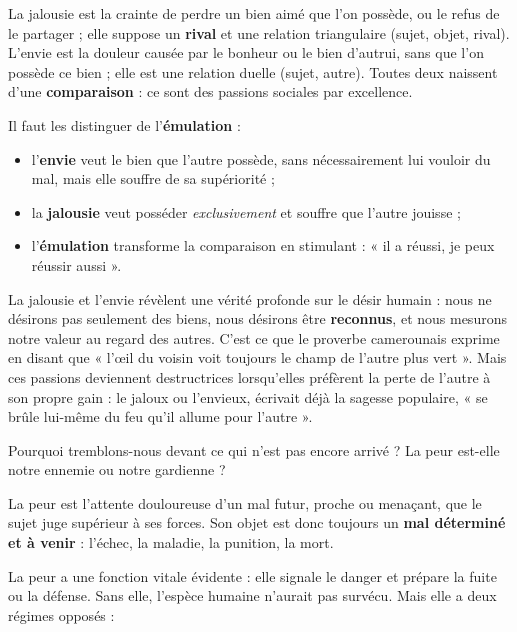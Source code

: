 \documentclass[11pt]{article}
\newcommand{\cle}[1]{{\popxbold\color{popdark}#1}}
\newcounter{popsec}
\newcounter{popsub}
\newcommand{\courssub}[1]{%
  \stepcounter{popsub}%
  \par\vspace{9pt}\noindent{\popxbold\fontsize{11.5}{13}\selectfont\color{popink}{\color{poporange}\thepopsec.\thepopsub}\hspace{6pt}#1}\par\nopagebreak\vspace{4pt}
}
\begin{document}
\begin{definition}
La \cle{jalousie} est la crainte de perdre un bien aimé que l'on possède, ou le refus de le partager ; elle suppose un \textbf{rival} et une relation triangulaire (sujet, objet, rival). L'\cle{envie} est la douleur causée par le bonheur ou le bien d'autrui, sans que l'on possède ce bien ; elle est une relation duelle (sujet, autre). Toutes deux naissent d'une \textbf{comparaison} : ce sont des passions sociales par excellence.
\end{definition}

Il faut les distinguer de l'\textbf{émulation} :

\begin{itemize}
\item l'\textbf{envie} veut le bien que l'autre possède, sans nécessairement lui vouloir du mal, mais elle souffre de sa supériorité ;
\item la \textbf{jalousie} veut posséder \emph{exclusivement} et souffre que l'autre jouisse ;
\item l'\textbf{émulation} transforme la comparaison en stimulant : « il a réussi, je peux réussir aussi ».
\end{itemize}

La jalousie et l'envie révèlent une vérité profonde sur le désir humain : nous ne désirons pas seulement des biens, nous désirons être \textbf{reconnus}, et nous mesurons notre valeur au regard des autres. C'est ce que le proverbe camerounais exprime en disant que « l'œil du voisin voit toujours le champ de l'autre plus vert ». Mais ces passions deviennent destructrices lorsqu'elles préfèrent la perte de l'autre à son propre gain : le jaloux ou l'envieux, écrivait déjà la sagesse populaire, « se brûle lui-même du feu qu'il allume pour l'autre ».

\courssub{La peur : l'attente d'un mal futur}

Pourquoi tremblons-nous devant ce qui n'est pas encore arrivé ? La peur est-elle notre ennemie ou notre gardienne ?

\begin{definition}[La peur]
La \cle{peur} est l'attente douloureuse d'un mal futur, proche ou menaçant, que le sujet juge supérieur à ses forces. Son objet est donc toujours un \textbf{mal déterminé et à venir} : l'échec, la maladie, la punition, la mort.
\end{definition}

La peur a une fonction vitale évidente : elle signale le danger et prépare la fuite ou la défense. Sans elle, l'espèce humaine n'aurait pas survécu. Mais elle a deux régimes opposés :
\end{document}
